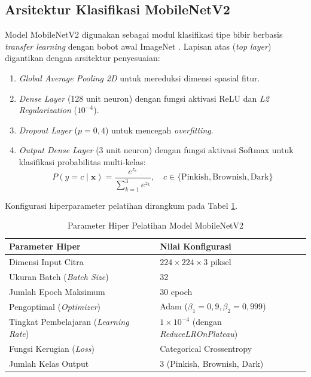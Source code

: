 \documentclass[10pt,a4paper]{article}
\begin{document}
\subsection{Arsitektur Klasifikasi MobileNetV2}
Model MobileNetV2 digunakan sebagai modul klasifikasi tipe bibir berbasis \textit{transfer learning} dengan bobot awal ImageNet \cite{sandler2018mobilenetv2}. Lapisan atas (\textit{top layer}) digantikan dengan arsitektur penyesuaian:
\begin{enumerate}
 \item \textit{Global Average Pooling 2D} untuk mereduksi dimensi spasial fitur.
 \item \textit{Dense Layer} (128 unit neuron) dengan fungsi aktivasi ReLU dan \textit{L2 Regularization} ($10^{-4}$).
 \item \textit{Dropout Layer} ($p = 0{,}4$) untuk mencegah \textit{overfitting}.
 \item \textit{Output Dense Layer} (3 unit neuron) dengan fungsi aktivasi Softmax untuk klasifikasi probabilitas multi-kelas:
 \begin{equation}
 P(y = c \mid \mathbf{x}) = \frac{e^{z_c}}{\sum_{k=1}^{3} e^{z_k}}, \quad c \in \{\text{Pinkish}, \text{Brownish}, \text{Dark}\}
 \end{equation}
\end{enumerate}
Konfigurasi hiperparameter pelatihan dirangkum pada Tabel \ref{tab:hyperparam}.

\begin{table}[htbp]
 \centering
 \caption{Parameter Hiper Pelatihan Model MobileNetV2}
 \label{tab:hyperparam}
 \fontsize{8.5pt}{11pt}\selectfont
 \begin{tabular}{ll}
 \toprule
 \textbf{Parameter Hiper} & \textbf{Nilai Konfigurasi} \\
 \midrule
 Dimensi Input Citra & $224 \times 224 \times 3$ piksel \\
 Ukuran Batch (\textit{Batch Size}) & 32 \\
 Jumlah Epoch Maksimum & 30 epoch \\
 Pengoptimal (\textit{Optimizer}) & Adam ($\beta_1 = 0{,}9, \beta_2 = 0{,}999$) \\
 Tingkat Pembelajaran (\textit{Learning Rate}) & $1 \times 10^{-4}$ (dengan \textit{ReduceLROnPlateau}) \\
 Fungsi Kerugian (\textit{Loss}) & Categorical Crossentropy \\
 Jumlah Kelas Output & 3 (Pinkish, Brownish, Dark) \\
 \bottomrule
 \end{tabular}
\end{table}
\end{document}
